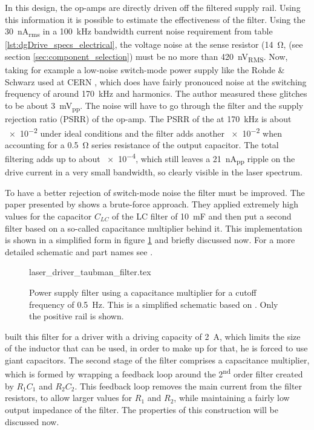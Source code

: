 In this design, the op-amps are directly driven off the filtered supply rail. Using this information it is possible to estimate the effectiveness of the filter. Using the \qty{30}{\nA_{rms}} in a \qty{100}{\kHz} bandwidth current noise requirement from table \ref{lst:dgDrive_specs_electrical}, the voltage noise at the sense resistor (\qty{14}{\ohm}, (see section \ref{sec:component_selection}) must be no more than \qty{420}{\nV_{RMS}}. Now, taking for example a low-noise switch-mode power supply like the Rohde \& Schwarz  used at CERN \cite{hmp4040_noise}, which does have fairly pronouced noise at the switching frequency of around \qty{170}{\kHz} and harmonics. The author measured these glitches to be about \qty{3}{\mV_{pp}}. The noise will have to go through the filter and the supply rejection ratio (PSRR) of the op-amp. The PSRR of the  at \qty{170}{\kHz} is about \num{e-2} under ideal conditions \cite{datasheet_LT1028} and the filter adds another \num{e-2} when accounting for a \qty{0.5}{\ohm} series resistance of the output capacitor. The total filtering adds up to about \num{e-4}, which still leaves a \qty{21}{\nA_{pp}} ripple on the drive current in a very small bandwidth, so clearly visible in the laser spectrum.

To have a better rejection of switch-mode noise the filter must be improved. The paper presented by \citeauthor{laser_driver_qcl_taubman} \cite{laser_driver_qcl_taubman} shows a brute-force approach. They applied extremely high values for the capacitor $C_{LC}$ of the LC filter of \qty{10}{\milli\farad} and then put a second filter based on a so-called capacitance multiplier behind it. This implementation is shown in a simplified form in figure \ref{fig:laser_driver_taubman_filter} and briefly discussed now. For a more detailed schematic and part names see \cite{laser_driver_qcl_taubman}.

\begin{figure}[ht]
    \centering
        {laser_driver_taubman_filter.tex}
    \caption{Power supply filter using a capacitance multiplier for a cutoff frequency of \qty{0.5}{\Hz}. This is a simplified schematic based on \cite{laser_driver_qcl_taubman}. Only the positive rail is shown.}
    \label{fig:laser_driver_taubman_filter}
\end{figure}

\citeauthor{laser_driver_qcl_taubman} built this filter for a driver with a driving capacity of \qty{2}{\A}, which limits the size of the inductor that can be used, in order to make up for that, he is forced to use giant capacitors. The second stage of the filter comprises a capacitance multiplier, which is formed by wrapping a feedback loop around the 2\textsuperscript{nd} order filter created by $R_1 C_1$ and $R_2 C_2$. This feedback loop removes the main current from the filter resistors, to allow larger values for $R_1$ and $R_2$, while maintaining a fairly low output impedance of the filter. The properties of this construction will be discussed now.

